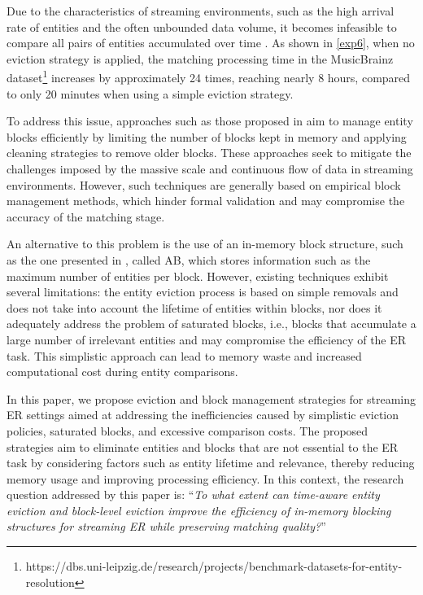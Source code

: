 \documentclass{ieeeaccess}
\begin{document}
Due to the characteristics of streaming environments,  such as the high arrival rate of entities and the often unbounded data volume, it becomes infeasible to compare all pairs of entities accumulated over time \cite{10.1145/3448016.3457238}. As shown in \ref{exp6}, when no eviction strategy is applied, the matching processing time in the MusicBrainz dataset\footnote{https://dbs.uni-leipzig.de/research/projects/benchmark-datasets-for-entity-resolution} increases by approximately 24 times, reaching nearly 8 hours, compared to only 20 minutes when using a simple eviction strategy.

To address this issue, approaches such as those proposed in \cite{Gazzarri2021,10.1145/3341105.3375776} aim to manage entity blocks efficiently by limiting the number of blocks kept in memory and applying cleaning strategies to remove older blocks. These approaches seek to mitigate the challenges imposed by the massive scale and continuous flow of data in streaming environments. However, such techniques are generally based on empirical block management methods, which hinder formal validation and may compromise the accuracy of the matching stage.

An alternative to this problem is the use of an in-memory block structure, such as the one presented in \cite{10.1109/TKDE.2024.3361022}, called AB, which stores information such as the maximum number of entities per block. However, existing techniques exhibit several limitations: the entity eviction process is based on simple removals and does not take into account the lifetime of entities within blocks, nor does it adequately address the problem of saturated blocks, i.e., blocks that accumulate a large number of irrelevant entities and may compromise the efficiency of the ER task. This simplistic approach can lead to memory waste and increased computational cost during entity comparisons.

In this paper, we propose eviction and block management strategies for streaming ER settings aimed at addressing the inefficiencies caused by simplistic eviction policies, saturated blocks, and excessive comparison costs. The proposed strategies aim to eliminate entities and blocks that are not essential to the ER task by considering factors such as entity lifetime and relevance, thereby reducing memory usage and improving processing efficiency. In this context, the research question addressed by this paper is: “\textit{To what extent can time-aware entity eviction and block-level eviction improve the efficiency of in-memory blocking structures for streaming ER while preserving matching quality?}”
\end{document}
